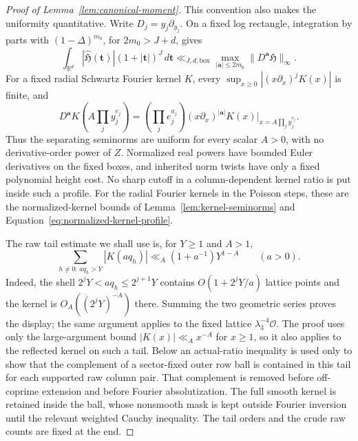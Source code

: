 \documentclass[12pt]{article}
\begin{document}
\begin{proof}[Proof of Lemma~\ref{lem:canonical-moment}]
This convention also makes the uniformity quantitative.  Write
\(D_j=y_j\partial_{y_j}\).  On a fixed log rectangle, integration by
parts with \((1-\Delta)^{m_0}\), for \(2m_0>J+d\), gives
\begin{equation}\label{eq:inverse-fourier-moment}
 \int_{\mathbb R^d}|\widehat{\mathfrak H}(\boldsymbol t)|
        (1+|\boldsymbol t|)^J\,d\boldsymbol t
 \ll_{J,d,\mathrm{box}}\max_{|\boldsymbol a|\le2m_0}
             \|D^{\boldsymbol a}\mathfrak H\|_\infty.
\end{equation}
For a fixed radial Schwartz Fourier kernel \(K\), every
\(\sup_{x\ge0}|(x\partial_x)^jK(x)|\) is finite, and
\[
 D^{\boldsymbol a}K\!\left(A\prod_jy_j^{e_j}\right)
 =\left(\prod_je_j^{a_j}\right)
   (x\partial_x)^{|\boldsymbol a|}K(x)
       \big|_{x=A\prod_jy_j^{e_j}}.
\]
Thus the separating seminorms are uniform for every scalar \(A>0\),
with no derivative-order power of \(Z\).  Normalized real powers have
bounded Euler derivatives on the fixed boxes, and inherited norm twists
have only a fixed polynomial height cost.  No sharp cutoff in a
column-dependent kernel ratio is put inside such a profile.
For the radial Fourier kernels in the Poisson steps, these are the
normalized-kernel bounds of Lemma~\ref{lem:kernel-seminorms} and
Equation~\eqref{eq:normalized-kernel-profile}.

The raw tail estimate we shall use is, for \(Y\ge1\) and \(A>1\),
\begin{equation}\label{eq:inverse-raw-tail}
 \sum_{h\ne0:\,a q_h>Y}|K(aq_h)|
 \ll_A(1+a^{-1})Y^{1-A}\qquad(a>0).
\end{equation}
Indeed, the shell \(2^jY<a q_h\le2^{j+1}Y\) contains
\(O(1+2^jY/a)\) lattice points and the kernel is
\(O_A((2^jY)^{-A})\) there.  Summing the two geometric series proves the
display; the same argument applies to the fixed lattice
\(\lambda_3^{-4}\mathcal O\).  The proof uses only the large-argument
bound \(|K(x)|\ll_Ax^{-A}\) for \(x\ge1\), so it also applies to the
reflected kernel on such a tail.  Below an actual-ratio inequality is used only
to show that the complement of a sector-fixed outer row ball is contained
in this tail for each supported raw column pair.  That complement is
removed before off-coprime extension and before Fourier absolutization.
The full smooth kernel is retained inside the ball, whose nonsmooth mask
is kept outside Fourier inversion until the relevant weighted Cauchy
inequality.  The tail orders and the crude raw counts are fixed at the end.


\end{proof}
\end{document}
